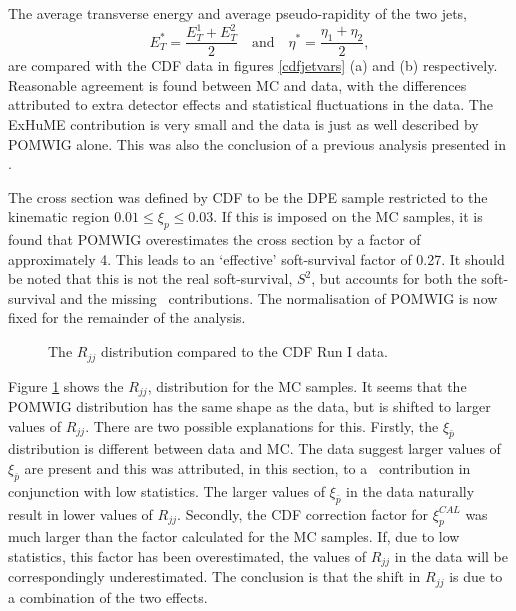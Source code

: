 The average transverse energy and average pseudo-rapidity of the two jets,
\begin{equation}\label{cdfjetavg}
E_T^{*} = \frac{E_{T}^{1}+ E_{T}^{2}}{2}
\quad \text{and} \quad
\eta^{*} = \frac{\eta_{1}+ \eta_{2}}{2},
\end{equation}
are compared with the CDF data in figures \ref{cdfjetvars} (a) and (b) respectively. Reasonable agreement is found between MC and data, with the differences attributed to extra detector effects and statistical fluctuations in the data. The ExHuME contribution is very small and the data is just as well described by POMWIG alone. This was also the conclusion of a previous analysis presented in \cite{Appleby:2001xk}.



The cross section was defined by CDF to be the DPE sample restricted to the kinematic region $0.01 \leq \xi_p \leq 0.03$. If this is imposed on the MC samples, it is found that POMWIG overestimates the cross section by a factor of approximately 4. This leads to an `effective' soft-survival factor of 0.27. It should be noted that this is not the real soft-survival, $S^2$, but accounts for both the soft-survival and the missing \Pom \Reg \, contributions. The normalisation of POMWIG is now fixed for the remainder of the analysis. 

\begin{figure} [t]
\centering
\caption[The di-jet mass fraction, $R_{jj}$, compared to the CDF Run I data]{The $R_{jj}$ distribution  compared to the CDF Run I data. \label{cdfrjjrun1}}
\end{figure}

Figure \ref{cdfrjjrun1} shows the $R_{jj}$, distribution for the MC samples. It seems that the POMWIG distribution has the same shape as the data, but is shifted to larger values of $R_{jj}$. There are two possible explanations for this. 
Firstly, the $\xi_{\bar{p}}$ distribution is different between data and MC. The data suggest larger values of $\xi_{\bar{p}}$ are present and this was attributed, in this section, to a \Pom \Reg \, contribution in conjunction with low statistics. The larger values of $\xi_{\bar{p}}$ in the data naturally result in lower values of $R_{jj}$. Secondly, the CDF correction factor for $\xi_p^{CAL}$ was much larger than the factor calculated for the MC samples. If, due to low statistics, this factor has been overestimated, the values of $R_{jj}$ in the data will be correspondingly underestimated. The conclusion is that the shift in $R_{jj}$ is due to a combination of the two effects. 


